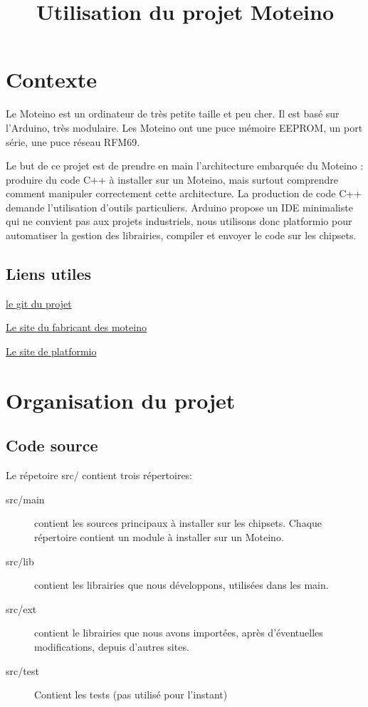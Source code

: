 \documentclass[a4paper]{report}
\title{Utilisation du projet Moteino}
\begin{document}
\dominitoc
\tableofcontents

\chapter{Contexte}

Le Moteino est un ordinateur de très petite taille et peu cher. Il est basé sur l'Arduino, très modulaire. Les Moteino ont une puce mémoire EEPROM, un port série, une puce réseau RFM69.

Le but de ce projet est de prendre en main l'architecture embarquée du Moteino : produire du code C++ à installer sur un Moteino, mais surtout comprendre comment manipuler correctement cette architecture.
La production de code C++ demande l'utilisation d'outils particuliers. Arduino propose un IDE minimaliste qui ne convient pas aux projets industriels, nous utilisons donc platformio pour automatiser la gestion des librairies, compiler et envoyer le code sur les chipsets.



\section{Liens utiles}

\href{https://github.com/glelouet/Moteino}{le git du projet}

\href{https://lowpowerlab.com/guide/moteino/}{Le site du fabricant des moteino}

\href{http://platformio.org/}{Le site de platformio}

\chapter{Organisation du projet}
\minitoc

\section{Code source}

Le répetoire src/ contient trois répertoires:
\begin{description}
\item[src/main] contient les sources principaux à installer sur les chipsets. Chaque répertoire contient un module à installer sur un Moteino.
\item[src/lib] contient les librairies que nous développons, utilisées dans les main.
\item[src/ext] contient le librairies que nous avons importées, après d'éventuelles modifications, depuis d'autres sites.
\item[src/test] Contient les tests (pas utilisé pour l'instant)
\end{description}
\end{document}
